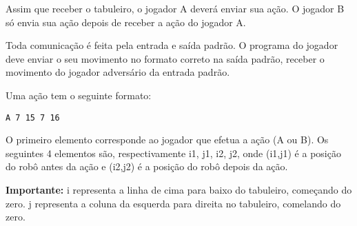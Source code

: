 \documentclass[a4paper,11pt]{article}
\begin{document}
Assim que receber o tabuleiro, o jogador A deverá enviar sua ação. O jogador B só envia sua ação depois de receber a ação do jogador A.

Toda comunicação é feita pela entrada e saída padrão. O programa do jogador deve enviar o seu movimento no formato correto na saída padrão, receber o movimento do jogador adversário da entrada padrão.

Uma ação tem o seguinte formato:
\begin{verbatim}
A 7 15 7 16
\end{verbatim}

O primeiro elemento corresponde ao jogador que efetua a ação (A ou B). Os seguintes 4 elementos são, respectivamente i1, j1, i2, j2, onde (i1,j1) é a posição do robô antes da ação e (i2,j2) é a posição do robô depois da ação.

\textbf{Importante:} i representa a linha de cima para baixo do tabuleiro, começando do zero. j representa a coluna da esquerda para direita no tabuleiro, comelando do zero.
\end{document}
